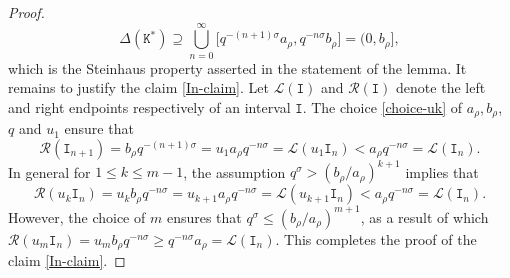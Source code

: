 \documentclass[a4paper,11pt]{amsart}
\numberwithin{equation}{section}
\begin{document}
\begin{proof}
\[ \Delta(\mathtt K^{\ast}) \supseteq \bigcup_{n=0}^{\infty} \bigl[q^{-(n+1)\sigma}a_{\rho}, q^{-n\sigma}b_{\rho} \bigr] = (0, b_{\rho}], \] 
which is the Steinhaus property asserted in the statement of the lemma. It remains to justify the claim \eqref{In-claim}. Let $\mathscr{L}(\mathtt I)$ and $\mathscr{R}(\mathtt I)$ denote the left and right endpoints respectively of an interval $\mathtt I$. The choice \eqref{choice-uk} of $a_{\rho}, b_{\rho}$, $q$ and $u_1$ ensure that
\[ \mathscr{R}(\mathtt I_{n+1}) = b_{\rho}q^{- (n+1) \sigma} = u_1 a_{\rho} q^{-n \sigma} = \mathscr{L}(u_1 \mathtt I_n) < a_{\rho} q^{-n \sigma} = \mathscr{L}(\mathtt I_n). \]
In general for $1 \leq k \leq m-1$, the assumption $q^{\sigma} > (b_{\rho}/a_{\rho})^{k+1}$ implies that  
\[
 \mathscr{R}(u_k \mathtt I_{n}) = u_k b_{\rho} q^{-n \sigma} = u_{k+1} a_{\rho} q^{-n \sigma}  =  \mathscr{L}(u_{k+1} \mathtt I_n) <  a_{\rho} q^{-n \sigma} = \mathscr{L}(\mathtt I_n). \]
However, the choice of $m$ ensures that $q^{\sigma} \leq (b_{\rho}/a_{\rho})^{m+1}$, as a result of which $\mathscr{R}(u_m \mathtt I_{n}) = u_m b_{\rho} q^{-n \sigma} \geq q^{-n \sigma} a_{\rho} = \mathscr{L}(\mathtt I_n)$. 
This completes the proof of the claim \eqref{In-claim}. 
\end{proof} 
\end{document}

